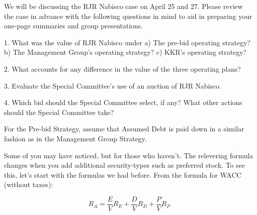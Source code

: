 \documentclass[letterpaper,11pt]{texMemo} %
\begin{document}
\maketitle %

We will be discussing the RJR Nabisco case on April 25 and 27. Please review the case in advance with the following questions in mind to aid in preparing your one-page summaries and group presentations.

1. What was the value of RJR Nabisco under
     a) The pre-bid operating strategy?
     b) The Management Group's operating strategy?
     c) KKR's operating strategy?
     
     
     
     
     
     
2. What accounts for any difference in the value of the three operating plans?





3. Evaluate the Special Committee's use of an auction of RJR Nabisco.




4. Which bid should the Special Committee select, if any? What other actions should the Special Committee take?




For the Pre-bid Strategy, assume that Assumed Debt is paid down in a similar fashion as in the Management Group Strategy. 

Some of you may have noticed, but for those who haven't. The relevering formula changes when you add additional security-types such as preferred stock. To see this, let's start with the formulas we had before. From the formula for WACC (without taxes):

$$R_A=\frac{E}{V}R_E+\frac{D}{V}R_D+\frac{P}{V}R_P$$


\end{document}
